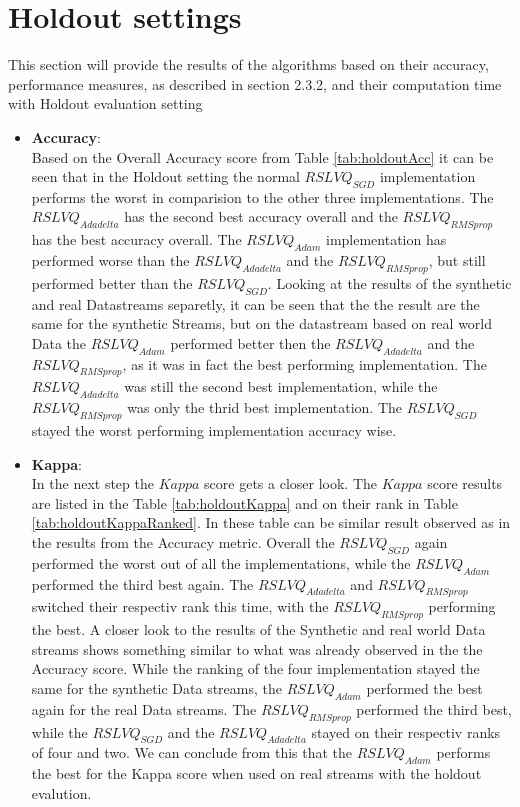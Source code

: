 \documentclass[12pt,oneside,a4paper,parskip]{scrbook}
\begin{document}
\section{Holdout settings}
This section will provide the results of the algorithms based on their accuracy, performance measures, as described in section 2.3.2,
and their computation time with Holdout evaluation setting

\begin{itemize}
  \item \textbf{Accuracy}: \\
        Based on the Overall Accuracy score from Table \ref{tab:holdoutAcc} it can be seen that in the Holdout setting the
        normal $RSLVQ_\textit{SGD}$ implementation performs the worst in comparision to the other three implementations.
        The $RSLVQ_\textit{Adadelta}$ has the second best accuracy overall and the $RSLVQ_\textit{RMSprop}$ has the best 
        accuracy overall. The $RSLVQ_\textit{Adam}$ implementation has performed worse than the $RSLVQ_\textit{Adadelta}$
        and the $RSLVQ_\textit{RMSprop}$, but still performed better than the $RSLVQ_\textit{SGD}$.
        Looking at the results of the synthetic and real Datastreams separetly, it can be seen that the the result are the same
        for the synthetic Streams, but on the datastream based on real world Data the $RSLVQ_\textit{Adam}$ performed better then
        the $RSLVQ_\textit{Adadelta}$ and the $RSLVQ_\textit{RMSprop}$, as it was in fact the best performing implementation.
        The $RSLVQ_\textit{Adadelta}$ was still the second best implementation, while the $RSLVQ_\textit{RMSprop}$ was only the thrid 
        best implementation. The $RSLVQ_\textit{SGD}$ stayed the worst performing implementation accuracy wise.

  \item \textbf{Kappa}: \\
        In the next step the $Kappa$ score gets a closer look. The $Kappa$ score results are listed in the 
        Table \ref{tab:holdoutKappa} and on their rank in Table \ref{tab:holdoutKappaRanked}.
        In these table can be similar result observed as in the results from the Accuracy metric.
        Overall the $RSLVQ_\textit{SGD}$ again performed the worst out of all the implementations, while the $RSLVQ_\textit{Adam}$
        performed the third best again. The $RSLVQ_\textit{Adadelta}$ and $RSLVQ_\textit{RMSprop}$ switched their respectiv rank this 
        time, with the $RSLVQ_\textit{RMSprop}$ performing  the best.
        A closer look to the results of the Synthetic and real world Data streams shows something
        similar to what was already observed in the the Accuracy score.
        While the ranking of the four implementation stayed the same for the synthetic Data streams, the $RSLVQ_\textit{Adam}$ performed 
        the best again for the real Data streams. The $RSLVQ_\textit{RMSprop}$ performed the third best, while the $RSLVQ_\textit{SGD}$ and
        the $RSLVQ_\textit{Adadelta}$ stayed on their respectiv ranks of four and two.
        We can conclude from this that the $RSLVQ_\textit{Adam}$ performs the best for the Kappa score when used on real streams with the holdout
        evalution.


\end{itemize}
\end{document}
